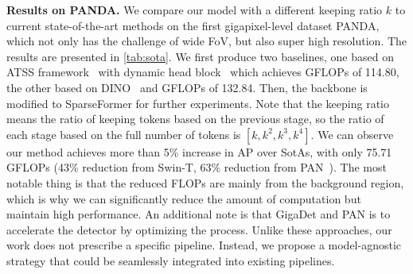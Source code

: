 \vspace{2mm}\noindent\textbf{Results on PANDA.}  
%
We compare our model with a different keeping ratio $k$ to current state-of-the-art methods on the first gigapixel-level dataset PANDA, which not only has the challenge of wide FoV, but also super high resolution. The results are presented in \cref{tab:sota}. 
We first produce two baselines, one based on ATSS framework~\cite{zhang2020atss} with dynamic head block~\cite{dai2021dynamic} which achieves GFLOPs of 114.80, the other based on DINO~\cite{zhang2022dino} and GFLOPs of 132.84. Then, the backbone is modified to SparseFormer for further experiments. Note that the keeping ratio means the ratio of keeping tokens based on the previous stage, so the ratio of each stage based on the full number of tokens is $[k, k^2, k^3, k^4] $. We can observe our method achieves more than 5\% increase in AP over SotAs, with only 75.71 GFLOPs (43\% reduction from Swin-T, 63\% reduction from PAN~\cite{fan2022speed}). The most notable thing is that the reduced FLOPs are mainly from the background region, which is why we can significantly reduce the amount of computation but maintain high performance. An additional note is that GigaDet and PAN is to accelerate the detector by optimizing the process. Unlike these approaches, our work does not prescribe a specific pipeline. Instead, we propose a model-agnostic strategy that could be seamlessly integrated into existing pipelines.



